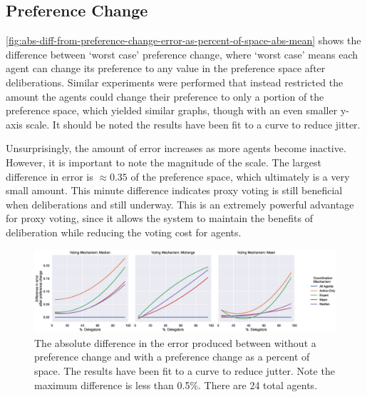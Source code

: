 \subsection{Preference Change}\label{subsec:results-shift}
\autoref{fig:abs-diff-from-preference-change-error-as-percent-of-space-abs-mean} shows
the difference between `worst case' preference change, where `worst case' means each
agent can change its preference to any value in the preference space after
deliberations.
Similar experiments were performed that instead restricted the amount the agents
could change their preference to only a portion of the preference space, which
yielded similar graphs, though with an even smaller y-axis scale.
It should be noted the results have been fit to a curve to reduce jitter.

Unsurprisingly, the amount of error increases as more agents become inactive.
However, it is important to note the magnitude of the scale.
The largest difference in error is $\approx 0.35$ of the preference space,
which ultimately is a very small amount. 
This minute difference indicates proxy voting is still beneficial when deliberations
and still underway.
This is an extremely powerful advantage for proxy voting, since it allows the system
to maintain the benefits of deliberation while reducing the voting cost for agents.

\begin{landscape}
    \begin{figure}[p]
        \centering
        \includegraphics[scale=0.55]
        {content/chapter2/figures/abs_diff_from_preference_change_error_as_percent_of_space_abs_mean}
        \caption{
            The absolute difference in the error produced between without a
            preference change and with a preference change as a percent of space.
            The results have been fit to a curve to reduce jutter.
            Note the maximum difference is less than 0.5\%.
            There are 24 total agents.
        }
        \label{fig:abs-diff-from-preference-change-error-as-percent-of-space-abs-mean}
    \end{figure}
\end{landscape}

